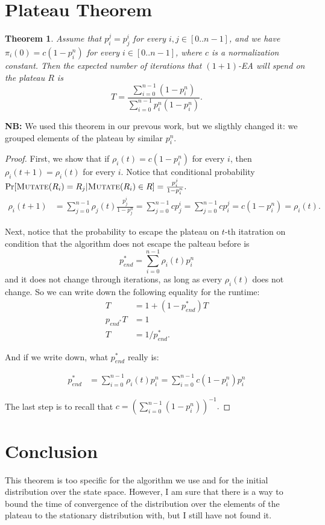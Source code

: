 \documentclass{article}
\newtheorem{theorem}{Theorem}
\begin{document}
\section{Plateau Theorem}
  \begin{theorem}
    Assume that $p_i^j = p_j^i$ for every $i, j \in [0..n-1]$, and we have $\pi_i(0) = c(1 - p_i^n)$ for every $i \in [0..n - 1]$, where $c$ is a normalization constant. Then the expected number of iterations that $(1 + 1)$-EA will spend on the plateau $R$ is
    $$T = \frac{\sum\limits_{i = 0}^{n - 1} (1 - p_i^n)}{\sum\limits_{i = 0}^{n - 1} p_i^n (1 - p_i^n)}.$$
  \end{theorem}

  \textbf{NB:} We used this theorem in our prevous work, but we sligthly changed it: we grouped elements of the plateau by similar $p_i^n.$

  \begin{proof}
    First, we show that if $\rho_i(t) = c(1 - p_i^n)$ for every $i$, then $\rho_i(t + 1) = \rho_i(t)$ for every $i$.
    Notice that conditional probability $\Pr[\textsc{Mutate}(R_i)=R_j | \textsc{Mutate}(R_i) \in R] = \frac{p_i^j}{1 - p_i^n}.$
    \begin{align*}
      \rho_i(t + 1) &= \sum\limits_{j = 0}^{n - 1} \rho_j(t) \frac{p_j^i}{1 - p_j^n} = \sum\limits_{j = 0}^{n - 1} cp_j^i = \sum\limits_{j = 0}^{n - 1} cp_i^j = c(1 - p_i^n) = \rho_i(t).
    \end{align*}

    Next, notice that the probability to escape the plateau on $t$-th itatration on condition that the algorithm does not escape the palteau before is $$p_{end}^* = \sum\limits_{i = 0}^{n - 1} \rho_i(t) p_i^n$$ and it does not change through iterations, as long as every $\rho_i(t)$ does not change. So we can write down the following equality for the runtime:
    \begin{align*}
      T &= 1 + (1 - p_{end}^*)T \\
      p_{end^*}T &= 1 \\
      T &= 1 / p_{end}^*.
    \end{align*}

    And if we write down, what $p_{end}^*$ really is:

    \begin{align*}
      p_{end}^* &= \sum\limits_{i = 0}^{n - 1} \rho_i(t) p_i^n = \sum\limits_{i = 0}^{n - 1} c(1 - p_i^n)p_i^n
    \end{align*}

    The last step is to recall that $c = \left(\sum\limits_{i = 0}^{n - 1} (1 - p_i^n)\right)^{-1}.$

  \end{proof}

\section{Conclusion}

This theorem is too specific for the algorithm we use and for the initial distribution over the state space. However, I am sure that there is a way to bound the time of convergence of the distribution over the elements of the plateau to the stationary distribution with, but I still have not found it.
\end{document}
